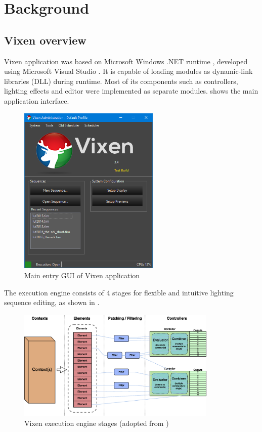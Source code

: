 \chapter{Background}
\renewcommand{\baselinestretch}{\mystretch}
\label{chap:BG}

\section{Vixen overview}

 Vixen application was based on Microsoft Windows .NET runtime \cite{dotnet}, developed using Microsoft Visual Studio \cite{msvs}. It is capable of loading modules as dynamic-link libraries (DLL) during runtime. Most of its components such as controllers, lighting effects and editor were implemented as separate modules.  shows the main application interface.

\begin{figure}[!t]
  \centering
  \includegraphics[width=0.6\textwidth]{Figs//vixen_main.png}
  \caption{\footnotesize Main entry GUI of Vixen application}
  \label{fig:vixen-main}
\end{figure}

The execution engine consists of 4 stages for flexible and intuitive lighting sequence editing, as shown in .

\begin{figure}[!t]
  \centering
  \includegraphics[width=0.85\textwidth]{Figs//V3-Engine-1.eps}
  \caption{\footnotesize Vixen execution engine stages (adopted from \cite{vixen})}
  \label{fig:stages}
\end{figure}

